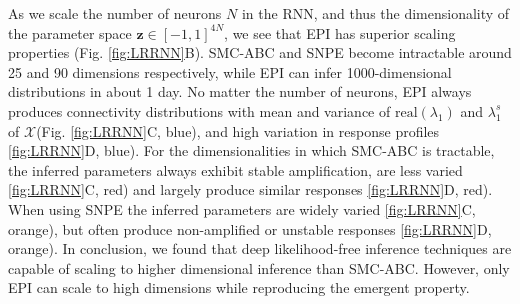 \documentclass[11pt]{article}
\begin{document}
As we scale the number of neurons $N$ in the RNN, and thus the dimensionality of the parameter space $\mathbf{z} \in [-1, 1]^{4N}$, we see that EPI has superior scaling properties (Fig. \ref{fig:LRRNN}B).
SMC-ABC and SNPE become intractable around 25 and 90 dimensions respectively, while EPI can infer 1000-dimensional distributions in about 1 day.
No matter the number of neurons, EPI always produces connectivity distributions with mean and variance of $\text{real}(\lambda_1)$ and $\lambda_1^s$ of $\mathcal{X}$(Fig. \ref{fig:LRRNN}C, blue), and high variation in response profiles \ref{fig:LRRNN}D, blue).
For the dimensionalities in which SMC-ABC is tractable, the inferred parameters always exhibit stable amplification, are less varied \ref{fig:LRRNN}C, red) and largely produce similar responses \ref{fig:LRRNN}D, red).
When using SNPE the inferred parameters are widely varied \ref{fig:LRRNN}C, orange), but often produce non-amplified or unstable responses \ref{fig:LRRNN}D, orange).
In conclusion, we found that deep likelihood-free inference techniques are capable of scaling to higher dimensional inference than SMC-ABC.
However, only EPI can scale to high dimensions while reproducing the emergent property.
\end{document}
